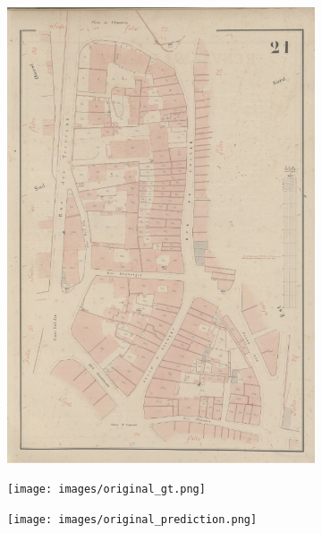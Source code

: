\documentclass[12pt]{article}
\begin{document}
\begin{figure}[H]
    \centering
	\begin{subfigure}[b]{.32\textwidth}
		\centering
		\includegraphics[width=1\linewidth]{images/original_image.png}  
		\label{fig:original-img}
	\end{subfigure}
	\begin{subfigure}[b]{.32\textwidth}
		\centering
		\texttt{[image: images/original\_gt.png]}  
		\label{fig:original-gt}
	\end{subfigure}
	\begin{subfigure}[b]{.32\textwidth}
		\centering
		\texttt{[image: images/original\_prediction.png]}  
		\label{fig:original-pre}
	\end{subfigure}
	

\end{figure}
\end{document}
